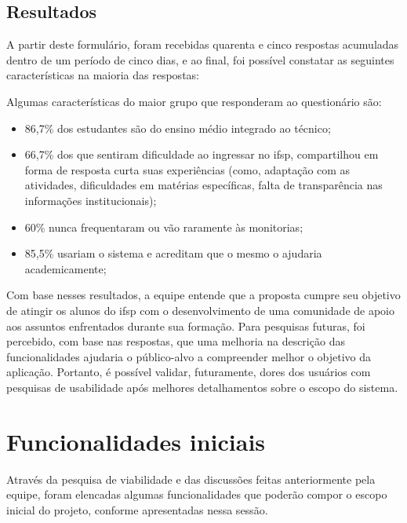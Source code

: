 \subsection{Resultados}

A partir deste formulário, foram recebidas quarenta e cinco respostas acumuladas dentro de um período de cinco dias, e ao final, foi possível constatar as seguintes características na maioria das respostas:

Algumas características do maior grupo que responderam ao questionário são: 

\begin{itemize}
    \item 86,7\% dos estudantes são do ensino médio integrado ao técnico;
    \item 66,7\% dos que sentiram dificuldade ao ingressar no \acs{ifsp}, compartilhou em forma de resposta curta suas experiências (como, adaptação com as atividades, dificuldades em matérias específicas, falta de transparência nas informações institucionais);
    \item 60\% nunca frequentaram ou vão raramente às monitorias;
    \item 85,5\% usariam o sistema e acreditam que o mesmo o ajudaria academicamente;
\end{itemize}

Com base nesses resultados, a equipe entende que a proposta cumpre seu objetivo de atingir os alunos do \acs{ifsp} com o desenvolvimento de uma comunidade de apoio aos assuntos enfrentados durante sua formação. Para pesquisas futuras, foi percebido, com base nas respostas, que uma melhoria na descrição das funcionalidades ajudaria o público-alvo a compreender melhor o objetivo da aplicação. Portanto, é possível validar, futuramente, dores dos usuários com pesquisas de usabilidade após melhores detalhamentos sobre o escopo do sistema.
\section{Funcionalidades iniciais}

Através da pesquisa de viabilidade e das discussões feitas anteriormente pela equipe, foram elencadas algumas funcionalidades que poderão compor o escopo inicial do projeto, conforme apresentadas nessa sessão. 

